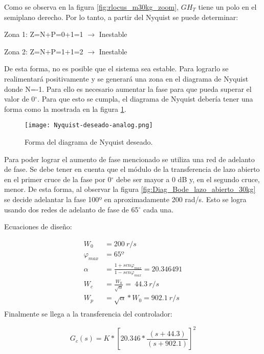\noindent Como se observa en la figura \ref{fig:rlocus_m30kg_zoom}, $GH_{T}$ tiene un polo en el semiplano derecho. Por lo tanto, a partir del Nyquist se puede determinar:

\noindent Zona 1: Z=N+P=0+1=1 $\mathrm{\to}$ Inestable 

\noindent Zona 2: Z=N+P=1+1=2 $\mathrm{\to}$ Inestable

\noindent De esta forma, no es posible que el sistema sea estable. Para lograrlo se realimentar\'{a} positivamente y se generar\'{a} una zona en el diagrama de Nyquist donde N=-1. Para ello es necesario aumentar la fase para que pueda superar el valor de 0$\mathrm{{}^\circ}$.  Para que esto se cumpla, el diagrama de Nyquist deber\'{i}a tener una forma como la  mostrada en la figura \ref{fig:nyquist-deseado-analog}.

\begin{figure}[H]
	\centering
	\texttt{[image: Nyquist-deseado-analog.png]}
	\caption{Forma del diagrama de Nyquist deseado.}
	\label{fig:nyquist-deseado-analog}
\end{figure}

\noindent Para poder lograr el aumento de fase mencionado se utiliza una red de adelanto de fase. Se debe tener en cuenta que el m\'{o}dulo de la transferencia de lazo abierto en el primer cruce de la fase por 0$\mathrm{{}^\circ}$ debe ser mayor a 0 dB y, en el segundo cruce, menor. De esta forma, al observar la figura \ref{fig:Diag_Bode_lazo_abierto_30kg} se decide adelantar la fase 100º en aproximadamente 200 rad/s. Esto se logra usando dos redes de adelanto de fase de 65$\mathrm{{}^\circ}$ cada una.

\noindent Ecuaciones de dise\~{n}o:

\begin{equation*}
	\begin{aligned}
		W_0 &=200\ r/s\\
		{\varphi }_{max} &=65\textrm{º}\\
		\alpha &=\frac{1+sen{\varphi }_{max}}{1-sen{\varphi }_{max}}=20.346491\\
		W_c &=\frac{W_0}{\sqrt{\alpha }}=\ 44.3\ r/s\\
		W_p &=\sqrt{\alpha }*W_0=902.1\ r/s\\
	\end{aligned}
\end{equation*} 
\noindent Finalmente se llega a la transferencia del controlador:

\begin{equation}  
	G_c(s)=K*{[20.346*\frac{(s+44.3)}{(s+902.1)}]}^2
\end{equation} 


